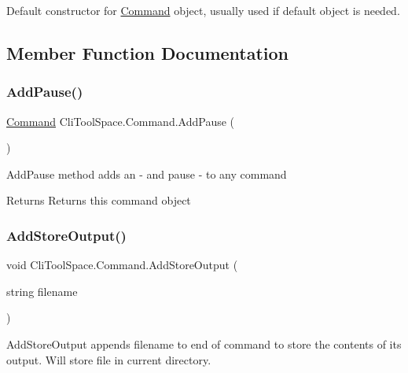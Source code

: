 Default constructor for \mbox{\hyperlink{class_cli_tool_space_1_1_command}{Command}} object, usually used if default object is needed. 



\subsection{Member Function Documentation}
\mbox{\label{class_cli_tool_space_1_1_command_a9e3b37320d8980e4c1e83eb109f486e5}} 
\subsubsection{\texorpdfstring{AddPause()}{AddPause()}}
{\footnotesize\ttfamily \mbox{\hyperlink{class_cli_tool_space_1_1_command}{Command}} Cli\+Tool\+Space.\+Command.\+Add\+Pause (\begin{DoxyParamCaption}{ }\end{DoxyParamCaption})}



Add\+Pause method adds an -\/ and pause -\/ to any command 

\begin{DoxyReturn}{Returns}
Returns this command object
\end{DoxyReturn}
\mbox{\label{class_cli_tool_space_1_1_command_aa49e056d4052177768a13fac33991942}} 
\subsubsection{\texorpdfstring{AddStoreOutput()}{AddStoreOutput()}}
{\footnotesize\ttfamily void Cli\+Tool\+Space.\+Command.\+Add\+Store\+Output (\begin{DoxyParamCaption}\item[{string}]{filename }\end{DoxyParamCaption})}



Add\+Store\+Output appends filename to end of command to store the contents of it\textquotesingle{}s output. Will store file in current directory. 


